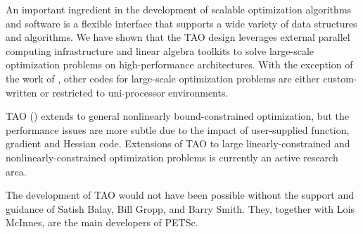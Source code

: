 \documentclass{esub2acm}
\begin{document}
An important ingredient in the development of scalable
optimization algorithms and software is a flexible interface that
supports a wide variety of data structures and algorithms.
We have shown that the TAO design leverages external
parallel computing infrastructure and
linear algebra toolkits to solve
large-scale optimization problems on high-performance
architectures.
With the exception of the work of 
,
other codes for large-scale optimization
problems are either custom-written
or restricted to uni-processor environments.

TAO ()
extends to general nonlinearly bound-constrained optimization,
but the performance issues are more subtle due to the
impact of user-supplied function, gradient and Hessian code.
Extensions of TAO to large
linearly-constrained and nonlinearly-constrained optimization
problems is currently an active research area.

\begin{acks}
The development of TAO would not have been possible without the
support and guidance of Satish Balay,
Bill Gropp, and Barry Smith.
They, together with Lois McInnes, are the main developers of PETSc.
\end{acks}

%

\end{document}
